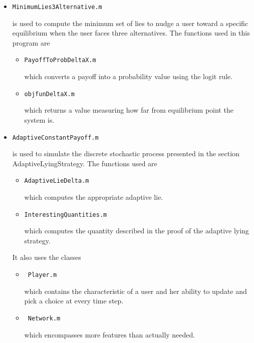 \documentclass[english]{article}
\begin{document}
\begin{itemize}
\item \begin{verbatim}MinimumLies3Alternative.m\end{verbatim} is used to compute the minimum set of lies to nudge a user toward a specific equilibrium when the user faces three alternatives.
The functions used in this program are
\begin{itemize}
\item \begin{verbatim}PayoffToProbDeltaX.m\end{verbatim} which converts a payoff into a probability value using the logit rule.
\item \begin{verbatim}objfunDeltaX.m\end{verbatim} which returns a value measuring how far from equilibrium point the system is.
\end{itemize}


\item \begin{verbatim}AdaptiveConstantPayoff.m\end{verbatim} is used to simulate the discrete stochastic process presented in the section AdaptiveLyingStrategy.
The functions used are
\begin{itemize}
\item \begin{verbatim}AdaptiveLieDelta.m \end{verbatim} which computes the appropriate adaptive lie.
\item \begin{verbatim}InterestingQuantities.m \end{verbatim} which computes the quantity described in the proof of the adaptive lying strategy.
\end{itemize}
It also uses the classes
\begin{itemize}
\item \begin{verbatim} Player.m \end{verbatim} which contains the characteristic of a user and her ability to update and pick a choice at every time step.
\item \begin{verbatim} Network.m \end{verbatim} which encompasses more features than actually needed.
\end{itemize}


\end{itemize}
\end{document}
